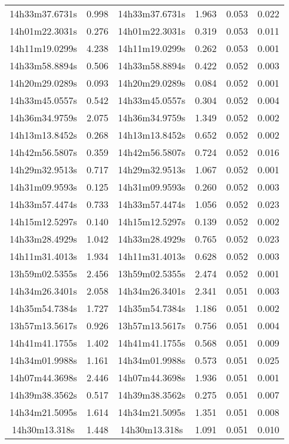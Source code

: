 \begin{table}
\begin{tabular}{cccccc}
14h33m37.6731s & 0.998 & 14h33m37.6731s & 1.963 & 0.053 & 0.022 \\
14h01m22.3031s & 0.276 & 14h01m22.3031s & 0.319 & 0.053 & 0.011 \\
14h11m19.0299s & 4.238 & 14h11m19.0299s & 0.262 & 0.053 & 0.001 \\
14h33m58.8894s & 0.506 & 14h33m58.8894s & 0.422 & 0.052 & 0.003 \\
14h20m29.0289s & 0.093 & 14h20m29.0289s & 0.084 & 0.052 & 0.001 \\
14h33m45.0557s & 0.542 & 14h33m45.0557s & 0.304 & 0.052 & 0.004 \\
14h36m34.9759s & 2.075 & 14h36m34.9759s & 1.349 & 0.052 & 0.002 \\
14h13m13.8452s & 0.268 & 14h13m13.8452s & 0.652 & 0.052 & 0.002 \\
14h42m56.5807s & 0.359 & 14h42m56.5807s & 0.724 & 0.052 & 0.016 \\
14h29m32.9513s & 0.717 & 14h29m32.9513s & 1.067 & 0.052 & 0.001 \\
14h31m09.9593s & 0.125 & 14h31m09.9593s & 0.260 & 0.052 & 0.003 \\
14h33m57.4474s & 0.733 & 14h33m57.4474s & 1.056 & 0.052 & 0.023 \\
14h15m12.5297s & 0.140 & 14h15m12.5297s & 0.139 & 0.052 & 0.002 \\
14h33m28.4929s & 1.042 & 14h33m28.4929s & 0.765 & 0.052 & 0.023 \\
14h11m31.4013s & 1.934 & 14h11m31.4013s & 0.628 & 0.052 & 0.003 \\
13h59m02.5355s & 2.456 & 13h59m02.5355s & 2.474 & 0.052 & 0.001 \\
14h34m26.3401s & 2.058 & 14h34m26.3401s & 2.341 & 0.051 & 0.003 \\
14h35m54.7384s & 1.727 & 14h35m54.7384s & 1.186 & 0.051 & 0.002 \\
13h57m13.5617s & 0.926 & 13h57m13.5617s & 0.756 & 0.051 & 0.004 \\
14h41m41.1755s & 1.402 & 14h41m41.1755s & 0.568 & 0.051 & 0.009 \\
14h34m01.9988s & 1.161 & 14h34m01.9988s & 0.573 & 0.051 & 0.025 \\
14h07m44.3698s & 2.446 & 14h07m44.3698s & 1.936 & 0.051 & 0.001 \\
14h39m38.3562s & 0.517 & 14h39m38.3562s & 0.275 & 0.051 & 0.007 \\
14h34m21.5095s & 1.614 & 14h34m21.5095s & 1.351 & 0.051 & 0.008 \\
14h30m13.318s & 1.448 & 14h30m13.318s & 1.091 & 0.051 & 0.010 \\

\end{tabular}
\end{table}
